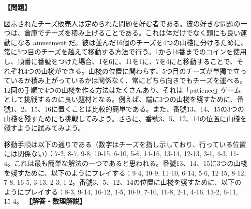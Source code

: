 \documentclass[10pt,a4paper,oneside,openany]{ltjsbook}
\begin{document}
\begin{tcolorbox}[colback=softblue,colframe=primaryblue,title=\textbf{第 233 問：eccentric cheese monger のパズル （原題: THE ECCENTRIC CHEESEMONGER.）},arc=2mm,boxrule=1pt,breakable]
\textbf{【問題】}\par\vspace{0.3em}
図示されたチーズ販売人は定められた問題を好む者である。彼の好きな問題の一つは、倉庫でチーズを積み上げることである。これは体だけでなく頭にも良い運動になる amusement だ。彼は並んだ16個のチーズを4つの山棧に分けるために、常に5つ目のチーズを越えて移動する方法で行う。1から16番までのコインを使用し、順番に番號をつけた場合、1を6に、11を1に、7を4にと移動することで、それぞれ4つの山棧ができる。山棧の位置に関わらず、5つ目のチーズが単獨で立っているか積み上がっているかは関係なく、常にどちら向きでもチーズを運べる。12回の手順で4つの山棧を作る方法はたくさんあり、それは「patience」ゲームとして挑戦するのに良い題材となる。例えば、端に3つの山棧を殘すために、番號1、2、15、16に置くことは比較的簡単である。また、番號13、14、15の3つの山棧を殘すためにも挑戦してみよう。さらに、番號3、5、12、14の位置に山棧を殘すように試みてみよう。

移動手順は以下の通りである（数字はチーズを指し示しており、行っている位置には関係ない）：7-2, 8-7, 9-8, 10-15, 6-10, 5-6, 14-16, 13-14, 12-13, 3-1, 4-3, 11-4。これは最も簡単な解法の一つであると思われる。番號13、14、15に3つの山棧を殘すために、以下のようにプレイする：9-4, 10-9, 11-10, 6-14, 5-6, 12-15, 8-12, 7-8, 16-5, 3-13, 2-3, 1-2。番號3、5、12、14の位置に山棧を殘すために、以下のようにプレイする：8-3, 9-14, 16-12, 1-5, 10-9, 7-10, 11-8, 2-1, 4-16, 13-2, 6-11, 15-4。
\tcblower
\textbf{【解答・数理解説】}\par\vspace{0.3em}

\end{tcolorbox}
\end{document}
